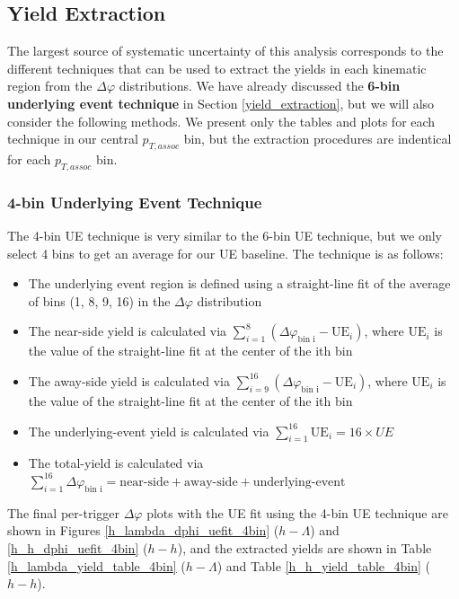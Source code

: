 \documentclass[ALICE,manyauthors]{ALICE_analysis_notes}
\begin{document}
\clearpage



\subsection{Yield Extraction}
The largest source of systematic uncertainty of this analysis corresponds to the different techniques that can be used to extract the yields in each kinematic region from the $\Delta\varphi$ distributions. We have already discussed the \textbf{6-bin underlying event technique} in Section \ref{yield_extraction}, but we will also consider the following methods. We present only the tables and plots for each technique in our central $p_{T, assoc}$ bin, but the extraction procedures are indentical for each $p_{T, assoc}$ bin.

\subsubsection{4-bin Underlying Event Technique}
\label{4bin}
The 4-bin UE technique is very similar to the 6-bin UE technique, but we only select 4 bins to get an average for our UE baseline. The technique is as follows:

\begin{itemize}
\item The underlying event region is defined using a straight-line fit of the average of bins (1, 8, 9, 16) in the $\Delta\varphi$ distribution
\item The near-side yield is calculated via $\sum_{i=1}^{8} (\Delta\varphi_\text{bin i} - \text{UE}_i)$, where $\text{UE}_i$ is the value of the straight-line fit at the center of the ith bin
\item The away-side yield is calculated via $\sum_{i=9}^{16} (\Delta\varphi_\text{bin i} - \text{UE}_i)$, where $\text{UE}_i$ is the value of the straight-line fit at the center of the ith bin
\item The underlying-event yield is calculated via $\sum_{i=1}^{16} \text{UE}_i = 16 \times UE$
\item The total-yield is calculated via $\sum_{i=1}^{16} \Delta\varphi_\text{bin i} = \text{near-side} + \text{away-side} + \text{underlying-event}$
\end{itemize}

The final per-trigger $\Delta\varphi$ plots with the UE fit using the 4-bin UE technique are shown in Figures \ref{h_lambda_dphi_uefit_4bin} ($h-\Lambda$) and \ref{h_h_dphi_uefit_4bin} ($h-h$), and the extracted yields are shown in Table \ref{h_lambda_yield_table_4bin} ($h-\Lambda$) and Table \ref{h_h_yield_table_4bin} ($h-h$).
\end{document}
